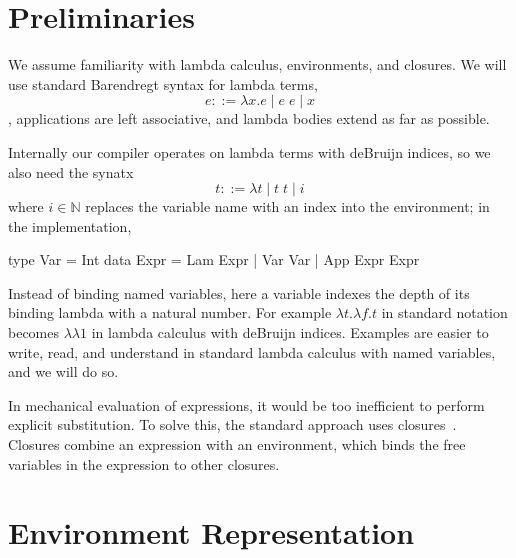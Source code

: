 \documentclass[preprint]{sigplanconf}
\begin{document}
\section{Preliminaries}

We assume familiarity with lambda calculus, environments, and closures.
We will use standard Barendregt syntax for lambda terms,
$$ e ::=  \lambda x . e \; | \; e \;  e \; | \;
x $$, applications are left
associative, and lambda bodies extend as far as possible. 

Internally our compiler operates on lambda terms with deBruijn indices,
so we also need the synatx $$ t ::= \lambda t \; | \; t \;
t \; | \; i $$ where $i \in \mathbb{N}$ replaces the variable name with an index
into the environment; in the implementation,
\begin{code}
type Var = Int
data Expr = Lam Expr
           | Var Var
           | App Expr Expr
\end{code}
Instead of
binding named variables, here a variable indexes the depth of its binding lambda with
a natural number. For example $\lambda t.\lambda f.t$ in standard notation
becomes $\lambda\lambda1$ in lambda calculus with deBruijn indices. 
Examples are easier to write, read, and understand in standard lambda
calculus with named variables, and we will do so.

In mechanical evaluation of expressions, it would be too inefficient to perform
explicit substitution. To solve this, the standard approach uses
closures~\cite{landin1964mechanical, curien1991abstract, jonesstg, biernacka2007concrete}.
Closures combine an expression with an environment, which binds the free
variables in the expression to other closures.

\section{Environment Representation} \label{sec:env}
\end{document}
